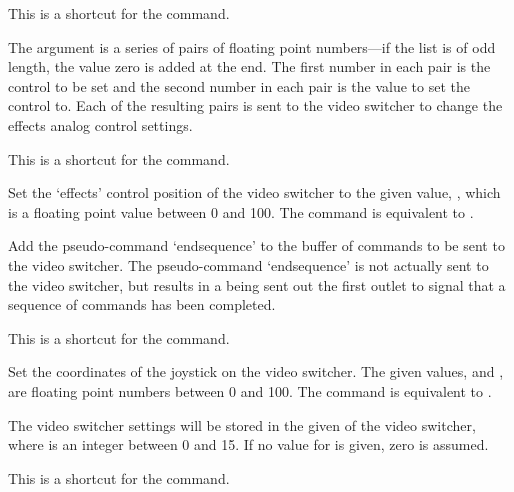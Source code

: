   This is a shortcut for the  command.

  The argument  is a series of pairs of floating point numbers---if the
  list is of odd length, the value zero is added at the end.
  The first number in each pair is the control to be set and the second number in each pair is the
  value to set the control to.
  Each of the resulting pairs is sent to the video switcher to change the effects analog control
  settings.

  This is a shortcut for the  command.

  Set the `effects' control position of the video switcher to the given value, ,
  which is a floating point value between 0 and 100.
  The command is equivalent to .

  Add the pseudo-command `endsequence' to the buffer of commands to be sent to the video switcher.
  The pseudo-command `endsequence' is not actually sent to the video switcher, but results in a
   being sent out the first outlet to signal that a sequence of commands has been
  completed.

  This is a shortcut for the  command.

  Set the coordinates of the joystick on the video switcher.
  The given values,  and , are floating point numbers
  between 0 and 100.
  The command is equivalent to .

  The video switcher settings will be stored in the given  of the video switcher,
  where  is an integer between 0 and 15.
  If no value for  is given, zero is assumed.

  This is a shortcut for the  command.

